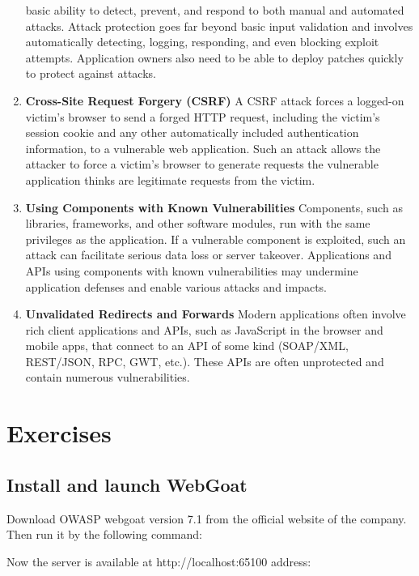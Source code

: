 \documentclass[14pt,a4paper,report]{report}
\begin{document}
\begin{enumerate}
	basic ability to detect, prevent, and respond to both manual and automated attacks. Attack
	protection goes far beyond basic input validation and involves automatically detecting,
	logging, responding, and even blocking exploit attempts. Application owners also
	need to be able to deploy patches quickly to protect against attacks.
	\item\textbf{ Cross-Site Request Forgery (CSRF)} A CSRF attack forces a logged-on victim’s browser
	to send a forged HTTP request, including the victim’s session cookie and any other automatically
	included authentication information, to a vulnerable web application. Such an
	attack allows the attacker to force a victim’s browser to generate requests the vulnerable
	application thinks are legitimate requests from the victim.
	\item\textbf{ Using Components with Known Vulnerabilities} Components, such as libraries, frameworks,
	and other software modules, run with the same privileges as the application.
	If a vulnerable component is exploited, such an attack can facilitate serious data loss
	or server takeover. Applications and APIs using components with known vulnerabilities
	may undermine application defenses and enable various attacks and impacts.
	\item \textbf{Unvalidated Redirects and Forwards} Modern applications often involve rich client applications
	and APIs, such as JavaScript in the browser and mobile apps, that connect
	to an API of some kind (SOAP/XML, REST/JSON, RPC, GWT, etc.). These APIs are often
	unprotected and contain numerous vulnerabilities.
\end{enumerate}

\section{Exercises}

\subsection{Install and launch WebGoat}

Download OWASP webgoat version 7.1 from the official website of the company. Then run it by the following command:



Now the server is available at http://localhost:65100 address:
\end{document}
